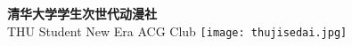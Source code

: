 \vspace*{0.7cm}  %

\begin{flushleft}
    \fontsize{30pt}{32pt}\selectfont
    \textbf{\textcolor{truepurple}{清华大学学生次世代动漫社}}
    \\[0ex]  %
    \fontsize{18pt}{20pt}\selectfont
    \textcolor{thuorange}{THU Student New Era ACG Club}
    \vspace{-1cm} %
    \noindent\hspace*{\dimexpr\textwidth-5cm-1cm}%
    \texttt{[image: thujisedai.jpg]}  %
\end{flushleft}
